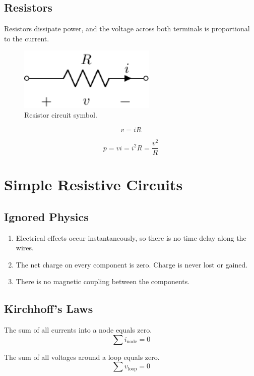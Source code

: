 \documentclass{article}
\begin{document}
\subsection{Resistors}
\begin{definition}[Resistor]
    Resistors dissipate power, and the voltage across both terminals is proportional to the current.
\end{definition}
\begin{figure}[H]
    \centering
    \includegraphics[height = 3cm, keepaspectratio = true]{figures/resistor.pdf}
    \caption{Resistor circuit symbol.}
\end{figure}
\begin{theorem}
    \begin{equation*}
        v = iR
    \end{equation*}
\end{theorem}
\begin{corollary}
    \begin{equation*}
        p = vi = i^2 R = \frac{v^2}{R}
    \end{equation*}
\end{corollary}
\newpage
\section{Simple Resistive Circuits}
\subsection{Ignored Physics}
\begin{enumerate}
    \item Electrical effects occur instantaneously, so there is no time delay along the wires.
    \item The net charge on every component is zero. Charge is never lost or gained.
    \item There is no magnetic coupling between the components.
\end{enumerate}
\subsection{Kirchhoff's Laws}
\begin{theorem}
    The sum of all currents into a node equals zero.
    \begin{equation*}
        \sum i_{\mathrm{node}} = 0
    \end{equation*}
\end{theorem}
\begin{theorem}
    The sum of all voltages around a loop equals zero.
    \begin{equation*}
        \sum v_{\mathrm{loop}} = 0
    \end{equation*}
\end{theorem}
\end{document}
